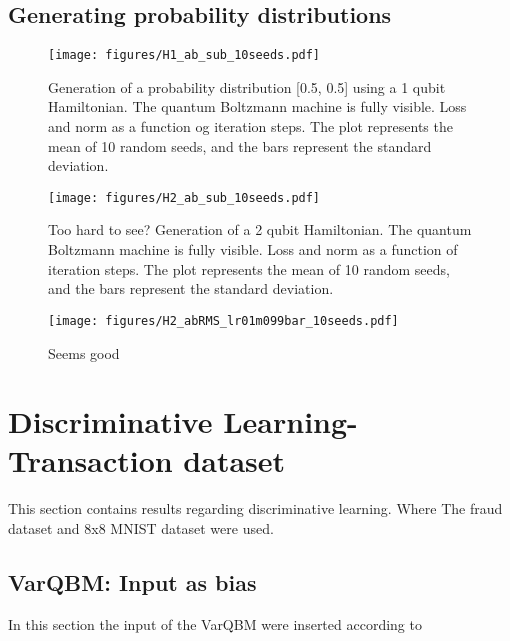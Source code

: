 \documentclass[../main.tex]{subfiles}
\begin{document}
\subsection{Generating probability distributions}

\begin{figure}
    \begin{center}
        \texttt{[image: figures/H1\_ab\_sub\_10seeds.pdf]}
        \caption{Generation of a probability distribution [0.5, 0.5] using a 1 qubit Hamiltonian. The quantum Boltzmann machine is fully visible. Loss and norm as a function og iteration steps. The plot represents the mean of 10 random seeds, and the bars represent the standard deviation.}
        \label{fig:nolabel}
    \end{center}
\end{figure}

\begin{figure}
    \begin{center}
        \texttt{[image: figures/H2\_ab\_sub\_10seeds.pdf]}
        \caption{Too hard to see? Generation of a 2 qubit Hamiltonian. The quantum Boltzmann machine is fully visible. Loss and norm as a function of iteration steps. The plot represents the mean of 10 random seeds, and the bars represent the standard deviation.}
        \label{fig:nolabel}
    \end{center}
\end{figure}

\begin{figure}
    \begin{center}
        \texttt{[image: figures/H2\_abRMS\_lr01m099bar\_10seeds.pdf]}
        \caption{Seems good}
        \label{fig:nolabel}
    \end{center}
\end{figure}

\section{Discriminative Learning-Transaction dataset}
This section contains results regarding discriminative learning. Where The fraud dataset and 8x8 MNIST dataset were used.

\subsection{VarQBM: Input as bias}
In this section the input of the VarQBM were inserted according to 
\end{document}
